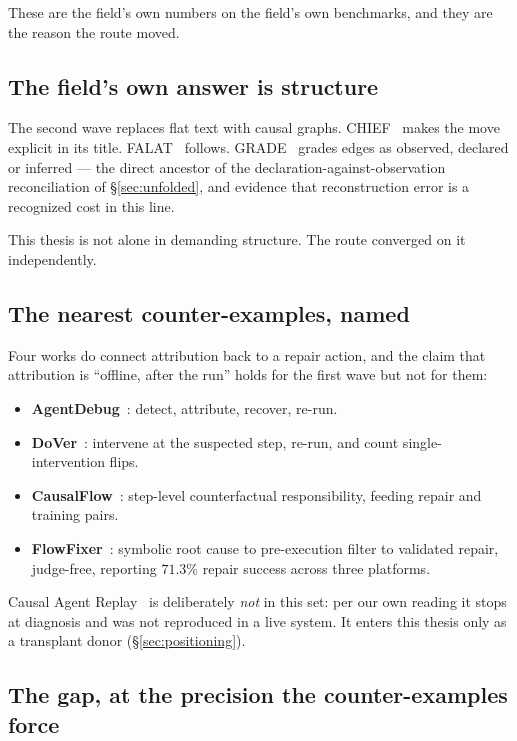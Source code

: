 These are the field's own numbers on the field's own benchmarks, and they
are the reason the route moved.

\subsection*{The field's own answer is structure}

The second wave replaces flat text with causal graphs. CHIEF~\cite{chief}
makes the move explicit in its title. FALAT~\cite{falat} follows.
GRADE~\cite{grade} grades edges as observed, declared or inferred --- the
direct ancestor of the declaration-against-observation reconciliation of
\S\ref{sec:unfolded}, and evidence that reconstruction error is a
recognized cost in this line.

This thesis is not alone in demanding structure. The route converged on it
independently.

\subsection*{The nearest counter-examples, named}

Four works do connect attribution back to a repair action, and the claim
that attribution is ``offline, after the run'' holds for the first wave but
not for them:

\begin{itemize}
  \item \textbf{AgentDebug}~\cite{agentdebug}: detect, attribute, recover,
        re-run.
  \item \textbf{DoVer}~\cite{dover}: intervene at the suspected step,
        re-run, and count single-intervention flips.
  \item \textbf{CausalFlow}~\cite{causalflow}: step-level counterfactual
        responsibility, feeding repair and training pairs.
  \item \textbf{FlowFixer}~\cite{flowfixer}: symbolic root cause to
        pre-execution filter to validated repair, judge-free, reporting
        $71.3\%$ repair success across three platforms.
\end{itemize}

Causal Agent Replay~\cite{car} is deliberately \emph{not} in this set: per
our own reading it stops at diagnosis and was not reproduced in a live
system. It enters this thesis only as a transplant donor
(\S\ref{sec:positioning}).

\subsection*{The gap, at the precision the counter-examples force}

